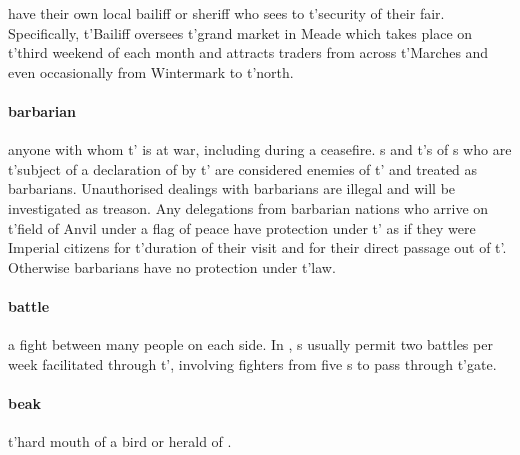 have their own local bailiff or sheriff who sees to t'\allowbreak security of their fair. Specifically, t'\allowbreak Bailiff oversees t'\allowbreak grand market in Meade which takes place on t'\allowbreak third weekend of each month and attracts traders from across t'\allowbreak Marches and even occasionally from Wintermark to t'\allowbreak north. 
\paragraph{barbarian} anyone with whom t'\allowbreak {} is at war, including during a ceasefire. s and t'\allowbreak {}s of s who are t'\allowbreak subject of a declaration of  by t'\allowbreak {} are considered enemies of t'\allowbreak {} and treated as barbarians. Unauthorised dealings with barbarians are illegal and will be investigated as treason. Any delegations from barbarian nations who arrive on t'\allowbreak field of Anvil under a flag of peace have protection under t'\allowbreak {} as if they were Imperial citizens for t'\allowbreak duration of their visit and for their direct passage out of t'\allowbreak {}. Otherwise barbarians have no protection under t'\allowbreak law.
\paragraph{battle} a fight between many people on each side. In , s usually permit two battles per week facilitated through t'\allowbreak {}, involving fighters from five s to pass through t'\allowbreak gate.
\paragraph{beak} t'\allowbreak hard mouth of a bird or herald of .
